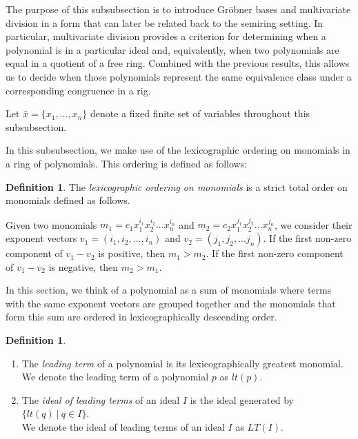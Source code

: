\documentclass{msthesis}
\theoremstyle{definition}
\newtheorem{definition}[theorem]{Definition}
\begin{document}
The purpose of this subsubsection is to introduce Gr\"obner bases and multivariate division in a form that can later be related back to the semiring setting. In particular, multivariate division provides a criterion for determining when a polynomial is in a particular ideal and, equivalently, when two polynomials are equal in a quotient of a free ring. Combined with the previous results, this allows us to decide when those polynomials represent the same equivalence class under a corresponding congruence in a rig.

Let $\bar{x} = \{x_1,...,x_n\}$ denote a fixed finite set of variables throughout this subsubsection.

In this subsubsection, we make use of the lexicographic ordering on monomials in a ring of polynomials.  This ordering is defined as follows:

\begin{definition}\label{def:lex}
The \emph{lexicographic ordering on monomials} is a strict total order on monomials defined as follows.  

Given two monomials $m_1 = c_1x_1^{i_1}x_2^{i_2}...x_n^{i_n}$ and $m_2 = c_2x_1^{j_1}x_2^{j_2}...x_n^{j_n}$, we consider their exponent vectors $v_1 = (i_1, i_2, ..., i_n)$ and $v_2 = (j_1, j_2, ... j_n)$.  If the first non-zero component of $v_1 - v_2$ is positive, then $m_1 > m_2$.  If the first non-zero component of $v_1 - v_2$ is negative, then $m_2 > m_1$.
\end{definition}

In this section, we think of a polynomial as a sum of monomials where terms with the same exponent vectors are grouped together and the monomials that form this sum are ordered in lexicographically descending order.\

\begin{definition} \hfill 
\begin{enumerate}[nosep]
\item    The \textit{leading term} of a polynomial is its lexicographically greatest monomial.\\  We denote the leading term of a polynomial $p$ as $lt(p)$.  
\item The \textit{ideal of leading terms} of an ideal $I$ is the ideal generated by $\{lt(q)\ |\ q \in I\}$.\\  We denote the ideal of leading terms of an ideal $I$ as $LT(I)$.
\end{enumerate}
\end{definition}
\end{document}
